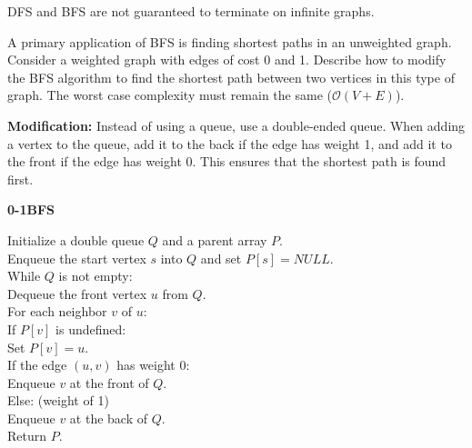 \documentclass[12pt]{exam}
\newcommand{\stars}[1]{%
    \foreach \n in {1,...,#1}{%
        $\filledstar$%
    }%
}
\begin{document}
\begin{questions}
    DFS and BFS are not guaranteed to terminate on infinite graphs.


    \clearpage

    \question[30] [W2/3, \stars{4}] A primary application of BFS is finding shortest paths in an unweighted graph. Consider a weighted graph with edges of cost 0 and 1. Describe how to modify the BFS algorithm to find the shortest path between two vertices in this type of graph. The worst case complexity must remain the same ($\mathcal{O}(V + E)$).

    \textbf{Modification:} Instead of using a queue, use a double-ended queue. When adding a vertex to the queue, add it to the back if the edge has weight 1, and add it to the front if the edge has weight 0. This ensures that the shortest path is found first.

    \textbf{0-1BFS}

    Initialize a double queue $Q$ and a parent array $P$. \\
    Enqueue the start vertex $s$ into $Q$ and set $P[s] = NULL$. \\
    While $Q$ is not empty: \\
    \hspace*{1cm} Dequeue the front vertex $u$ from $Q$. \\
    \hspace*{1cm} For each neighbor $v$ of $u$: \\
    \hspace*{2cm} If $P[v]$ is undefined: \\
    \hspace*{3cm} Set $P[v] = u$. \\
    \hspace*{3cm} If the edge $(u, v)$ has weight 0: \\
    \hspace*{4cm} Enqueue $v$ at the front of $Q$. \\
    \hspace*{3cm} Else: (weight of 1)\\
    \hspace*{4cm} Enqueue $v$ at the back of $Q$. \\
    Return $P$.
\end{questions}
\end{document}
